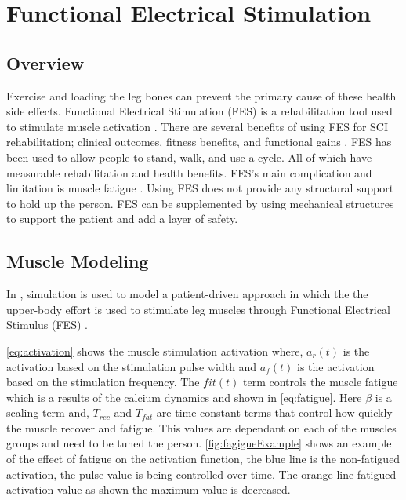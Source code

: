 
\section{Functional Electrical Stimulation}
\label{sec:FES}
\subsection{Overview}

Exercise and loading the leg bones can prevent the primary cause of these health side effects. Functional Electrical Stimulation (FES) is a rehabilitation tool used to stimulate muscle activation  \cite{quintero2012preliminary}. There are several benefits of using FES for SCI rehabilitation; clinical outcomes, fitness benefits, and functional gains \cite{hamid2008role}. FES has been used to allow people to stand, walk, and use a cycle\cite{mazzoleni2013fes}. All of which have measurable rehabilitation and health benefits. FES's main complication and limitation is muscle fatigue \cite{karu1995reducing}. Using FES  does not provide any structural support to hold up the person. FES can be supplemented by using mechanical structures to support the patient and add a layer of safety. 

\subsection{Muscle Modeling}
 In \cite{reiner1998patient}, simulation is used to model a patient-driven approach in which the the upper-body effort is used to stimulate leg muscles through Functional Electrical Stimulus (FES) \cite{lynch2008functional} \cite{rushton1997functional}. 
 
 \autoref{eq:activation} shows the muscle stimulation activation where, $a_r(t)$ is the activation based on the stimulation pulse width and $a_f(t)$ is the activation based on the stimulation frequency. The $fit(t)$ term controls the muscle fatigue which is a results of the calcium dynamics and shown in \autoref{eq:fatigue}. Here $\beta$ is a scaling term and, $T_{rec}$ and $T_{fat}$ are time constant terms that control how quickly the muscle recover and fatigue. This values are dependant on each of the muscles groups and need to be tuned the person. \autoref{fig:fagigueExample} shows an example of the effect of fatigue on the activation function, the blue line is the non-fatigued activation, the pulse value is being controlled over time. The orange line fatigued activation value as shown the maximum value is decreased. 
 
